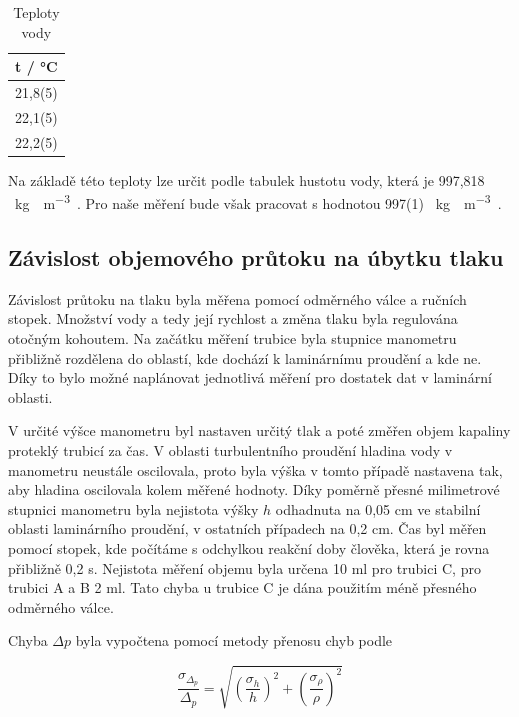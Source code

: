     \begin{table}[h]
        \centering
        \caption{Teploty vody}
        \label{tab:teploty_vody}
        \begin{tabular}{|c|} 
        \hline
            t / °C   \\ 
        \hline
            21,8(5)  \\
            22,1(5)  \\
            22,2(5)  \\
        \hline
        \end{tabular}
    \end{table}

    Na základě této teploty lze určit podle tabulek hustotu vody, která je 997,818 \SI{}{\kg\water\per\m\cubed\air}. Pro naše měření bude však pracovat s hodnotou 997(1) \SI{}{\kg\water\per\m\cubed\air}.

\subsection{Závislost objemového průtoku na úbytku tlaku}

    Závislost průtoku na tlaku byla měřena pomocí odměrného válce a ručních stopek. Množství vody a tedy její rychlost a změna tlaku byla regulována otočným kohoutem. Na začátku měření trubice byla stupnice manometru přibližně rozdělena do oblastí, kde dochází k laminárnímu proudění a kde ne. Díky to bylo možné naplánovat jednotlivá měření pro dostatek dat v laminární oblasti.

    V určité výšce manometru byl nastaven určitý tlak a poté změřen objem kapaliny proteklý trubicí za čas. V oblasti turbulentního proudění hladina vody v manometru neustále oscilovala, proto byla výška v tomto případě nastavena tak, aby hladina oscilovala kolem měřené hodnoty. Díky poměrně přesné milimetrové stupnici manometru byla nejistota výšky \(h\) odhadnuta na 0,05 cm ve stabilní oblasti laminárního proudění, v ostatních případech na 0,2 cm. Čas byl měřen pomocí stopek, kde počítáme s odchylkou reakční doby člověka, která je rovna přibližně 0,2 s. Nejistota měření objemu byla určena 10 ml pro trubici C, pro trubici A a B 2 ml. Tato chyba u trubice C je dána použitím méně přesného odměrného válce.
    
    Chyba \(\Delta p\) byla vypočtena pomocí metody přenosu chyb podle

    \begin{equation}
        \frac{\sigma_\Delta_p}{\Delta_p} = \sqrt{(\frac{\sigma_h}{h})^2 + (\frac{\sigma_\rho}{\rho})^2}
    \end{equation}

